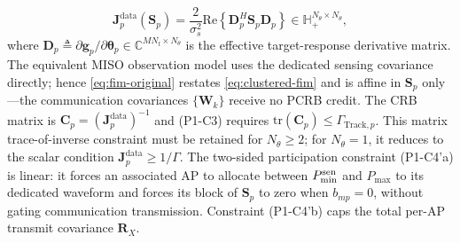 \documentclass[12pt,a4paper]{article}
\newcommand{\vect}[1]{\mathbf{#1}}
\newcommand{\mat}[1]{\mathbf{#1}}
\newcommand{\tr}{\text{tr}}
\newcommand{\Real}{\text{Re}}
\begin{document}
\begin{equation}\label{eq:fim-original}
\mat{J}_p^{\text{data}}(\mat{S}_p) = \frac{2}{\sigma_s^2} \Real\!\left\{ \mat{D}_p^H \mat{S}_p \mat{D}_p \right\} \in \mathbb{H}_+^{N_\theta \times N_\theta},
\end{equation}
where $\mat{D}_p \triangleq \partial \vect{g}_p / \partial \boldsymbol{\theta}_p \in \mathbb{C}^{MN_t \times N_\theta}$ is the effective target-response derivative matrix. The equivalent MISO observation model uses the dedicated sensing covariance directly; hence \eqref{eq:fim-original} restates \eqref{eq:clustered-fim} and is affine in $\mat{S}_p$ only---the communication covariances $\{\mat{W}_k\}$ receive no PCRB credit. The CRB matrix is $\mat{C}_p=(\mat{J}_p^{\text{data}})^{-1}$ and (P1-C3) requires $\tr(\mat{C}_p)\leq\Gamma_{\text{Track},p}$. This matrix trace-of-inverse constraint must be retained for $N_\theta\geq2$; for $N_\theta=1$, it reduces to the scalar condition $\mat{J}_p^{\text{data}}\geq1/\Gamma$. The two-sided participation constraint (P1-C4'a) is linear: it forces an associated AP to allocate between $P_{\min}^{\rm sen}$ and $P_{\max}$ to its dedicated waveform and forces its block of $\mat{S}_p$ to zero when $b_{mp}=0$, without gating communication transmission. Constraint (P1-C4'b) caps the total per-AP transmit covariance $\mat{R}_X$.
\end{document}

